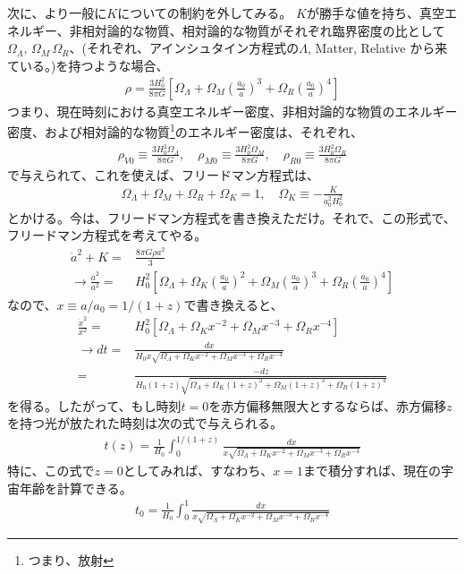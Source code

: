 \documentclass[11pt]{ltjsarticle}
\theoremstyle{plain}
\theoremstyle{break}
\begin{document}
次に、より一般に$K$についての制約を外してみる。
$K$が勝手な値を持ち、真空エネルギー、非相対論的な物質、相対論的な物質がそれぞれ臨界密度の比として$\Omega_{\Lambda}, \, \Omega_{M} \, \Omega_{R}、$(それぞれ、アインシュタイン方程式の$\Lambda$, Matter, Relative から来ている。)を持つような場合、
\begin{align}
  \rho=\frac{3 H_{0}^{2}}{8 \pi G}\left[\Omega_{\Lambda}+\Omega_{M}\left(\frac{a_{0}}{a}\right)^{3}+\Omega_{R}\left(\frac{a_{0}}{a}\right)^{4}\right]
\end{align}%
つまり、現在時刻における真空エネルギー密度、非相対論的な物質のエネルギー密度、および相対論的な物質\footnote{つまり、放射}のエネルギー密度は、それぞれ、
\begin{align}
  \rho_{V 0} \equiv \frac{3 H_{0}^{2} \Omega_{\Lambda}}{8 \pi G}, \quad \rho_{M 0} \equiv \frac{3 H_{0}^{2} \Omega_{M}}{8 \pi G}, \quad \rho_{R 0} \equiv \frac{3 H_{0}^{2} \Omega_{R}}{8 \pi G}
\end{align}%
で与えられて、これを使えば、フリードマン方程式は、
\begin{align}
  \Omega_{\Lambda}+\Omega_{M}+\Omega_{R}+\Omega_{K}=1, \quad \Omega_{K} \equiv-\frac{K}{a_{0}^{2} H_{0}^{2}}
\end{align}%
とかける。今は、フリードマン方程式を書き換えただけ。それで、この形式で、フリードマン方程式を考えてやる。
\begin{align}
  \dot{a}^2 + K =& \frac{8\pi G \rho a^2}{3}\\
  \rightarrow \frac{\dot{a}^2}{a^2} =& H_0^2  \left[ \Omega_{\Lambda} + \Omega_{K}\left(\frac{a_0}{a}\right)^2 + \Omega_{M} \left(\frac{a_0}{a}\right)^3 +\Omega_{R} \left(\frac{a_0}{a}\right)^4 \right]
\end{align}
なので、$x \equiv a/a_0 = 1/(1+z)$で書き換えると、
\begin{align}
    \frac{\dot{x}^2}{x^2} 
      =&H_0^2  \left[ \Omega_{\Lambda} + \Omega_{K}x^{-2} + \Omega_{M} x^{-3} + \Omega_{R} x^{-4} \right]\\
    \rightarrow
    dt
      =& \frac{dx}{H_0 x \sqrt{ \Omega_{\Lambda} + \Omega_{K}x^{-2} + \Omega_{M} x^{-3} + \Omega_{R} x^{-4}  }}\\
      =&\frac{-d z}{H_{0}(1+z) \sqrt{\Omega_{\Lambda}+\Omega_{K}(1+z)^{2}+\Omega_{M}(1+z)^{3}+\Omega_{R}(1+z)^{4}}}
\end{align}%
を得る。したがって、もし時刻$t=0$を赤方偏移無限大とするならば、赤方偏移$z$を持つ光が放たれた時刻は次の式で与えられる。
\begin{align}
  t(z)=\frac{1}{H_{0}} \int_{0}^{1 /(1+z)} \frac{d x}{x \sqrt{\Omega_{\Lambda}+\Omega_{K} x^{-2}+\Omega_{M} x^{-3}+\Omega_{R} x^{-4}}}
\end{align}%
特に、この式で$z=0$としてみれば、すなわち、$x = 1$まで積分すれば、現在の宇宙年齢を計算できる。
\begin{align}
  t_{0}=\frac{1}{H_{0}} \int_{0}^{1} \frac{d x}{x \sqrt{\Omega_{\Lambda}+\Omega_{K} x^{-2}+\Omega_{M} x^{-3}+\Omega_{R} x^{-4}}}
\end{align}%
\end{document}
